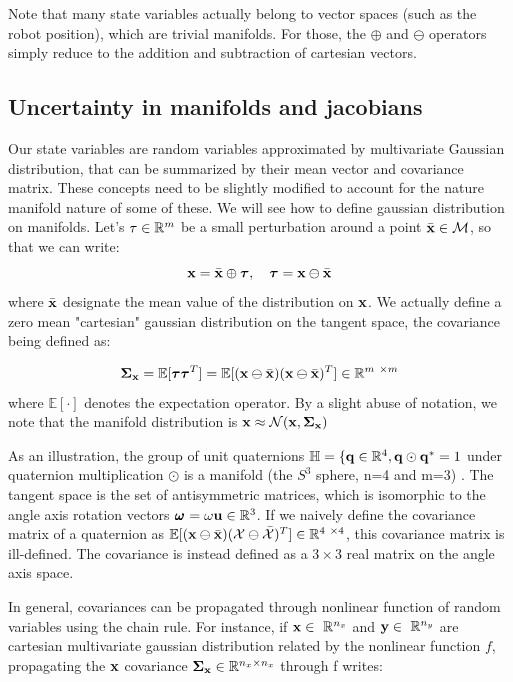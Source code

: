 Note that many state variables actually belong to vector spaces (such as the robot position), which are trivial manifolds. For those, the $\oplus$ and $\ominus$ operators
simply reduce to the addition and subtraction of cartesian vectors.  



\subsection{Uncertainty in manifolds and jacobians}
Our state variables are random variables approximated by multivariate Gaussian distribution, that can be summarized by their mean vector and covariance matrix.
These concepts need to be slightly modified to account for the nature manifold nature of some of these. We will see how to define gaussian distribution on manifolds.
Let's $\tau \in \mathbb{R}^m$ be a small perturbation around a point $\bar{{\bf x}} \in \mathcal{M}$, so that we can write:
%
\begin{equation}
    {\bf x} = \bar{{\bf x}} \oplus {\bm \tau}, \quad {\bm \tau} = {\bf x} \ominus \bar{{\bf x}}
\end{equation}
%
where $\bar{{\bf x}}$ designate the mean value of the distribution on ${\bf x}$. 
We actually define a zero mean "cartesian" gaussian distribution on the tangent space, the covariance being defined as:

\begin{equation}
    \Cov_{\bfx} = \mathbb{E}[\bftau\bftau^T] = \mathbb{E}[(\bfx \ominus \bar{\bfx})(\bfx \ominus \bar{\bfx})^T] \in \Reals^{m \times m}
\end{equation}
where $\mathbb{E}[\cdot]$ denotes the expectation operator.
By a slight abuse of notation, we note that the manifold distribution is ${\bf x} \approx \mathcal{N}({{\bf x}},{{\bm \Sigma}_{{\bf x}}})$

As an illustration, the group of unit quaternions $\mathbb{H} = \{ {\bf q} \in \mathbb{R}^4, {\bf q} \odot {\bf q}^*=1$ under quaternion multiplication $\odot$ is a manifold  
(the $S^3$ sphere, n=4 and m=3) \cite{sola2012quaternion}. 
The tangent space is the set of antisymmetric matrices, which is isomorphic to the angle axis rotation vectors $\prescript{}{}{\pmb{\omega}}_{} = \omega {\bf u} \in \mathbb{R}^3$.
If we naively define the covariance matrix of a quaternion as $\mathbb{E}[(\bfx \ominus \bar{\bfx})(\cX \ominus \bar{\cX})^T] \in \Reals^{4 \times 4}$, 
this covariance matrix is ill-defined. The covariance is instead defined as a $3 \times 3$ real matrix on the angle axis space.

In general, covariances can be propagated through nonlinear function of random variables using the chain rule. For instance, if $\bfx \in \Reals^{n_x}$ and 
$\bfy \in \Reals^{n_y}$ are cartesian multivariate gaussian distribution related by the nonlinear function $f$, propagating the ${\bf x}$ covariance 
${\bm \Sigma}_{{\bf x}} \in \mathbb{R}^{n_x \times n_x}$ through f writes:

